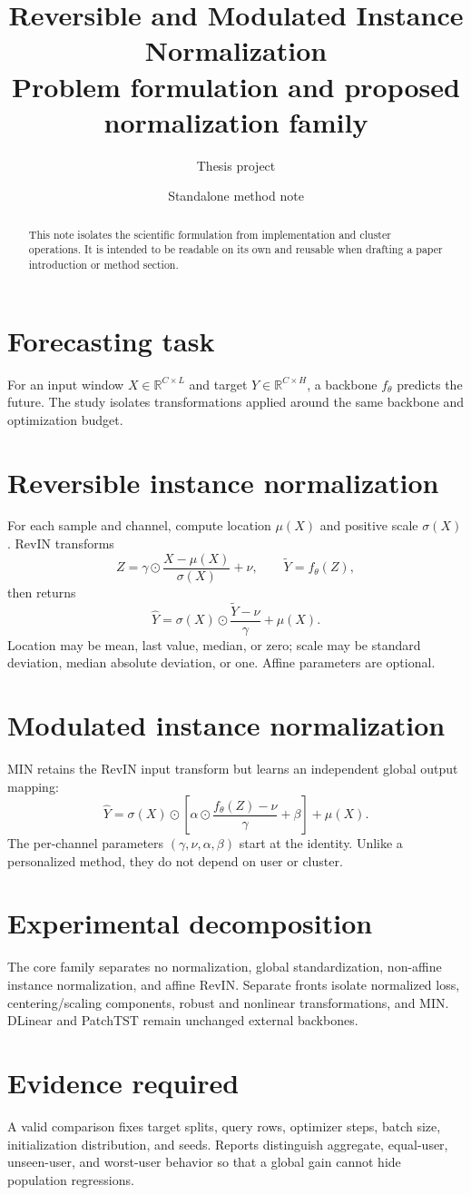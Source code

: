 \documentclass[10pt]{article}
\title{\color{navy}Reversible and Modulated Instance Normalization\\[3pt]\large Problem formulation and proposed normalization family}
\author{Thesis project}
\date{Standalone method note}
\newcommand{\R}{\mathbb{R}}
\begin{document}
\maketitle
\begin{abstract}
This note isolates the scientific formulation from implementation and cluster
operations. It is intended to be readable on its own and reusable when drafting
a paper introduction or method section.
\end{abstract}

\section{Forecasting task}
For an input window $X\in\R^{C\times L}$ and target
$Y\in\R^{C\times H}$, a backbone $f_\theta$ predicts the future. The study
isolates transformations applied around the same backbone and optimization
budget.

\section{Reversible instance normalization}
For each sample and channel, compute location $\mu(X)$ and positive scale
$\sigma(X)$. RevIN transforms
\[
 Z=\gamma\odot\frac{X-\mu(X)}{\sigma(X)}+\nu,
 \qquad \widetilde Y=f_\theta(Z),
\]
then returns
\[
 \widehat Y=\sigma(X)\odot
 \frac{\widetilde Y-\nu}{\gamma}+\mu(X).
\]
Location may be mean, last value, median, or zero; scale may be standard
deviation, median absolute deviation, or one. Affine parameters are optional.

\section{Modulated instance normalization}
MIN retains the RevIN input transform but learns an independent global output
mapping:
\[
 \widehat Y=\sigma(X)\odot
 \left[\alpha\odot\frac{f_\theta(Z)-\nu}{\gamma}+\beta\right]
 +\mu(X).
\]
The per-channel parameters $(\gamma,\nu,\alpha,\beta)$ start at the
identity. Unlike a personalized method, they do not depend on user or cluster.

\section{Experimental decomposition}
The core family separates no normalization, global standardization,
non-affine instance normalization, and affine RevIN. Separate fronts isolate
normalized loss, centering/scaling components, robust and nonlinear
transformations, and MIN. DLinear and PatchTST remain unchanged external
backbones.

\section{Evidence required}
A valid comparison fixes target splits, query rows, optimizer steps, batch
size, initialization distribution, and seeds. Reports distinguish aggregate,
equal-user, unseen-user, and worst-user behavior so that a global gain cannot
hide population regressions.
\end{document}
